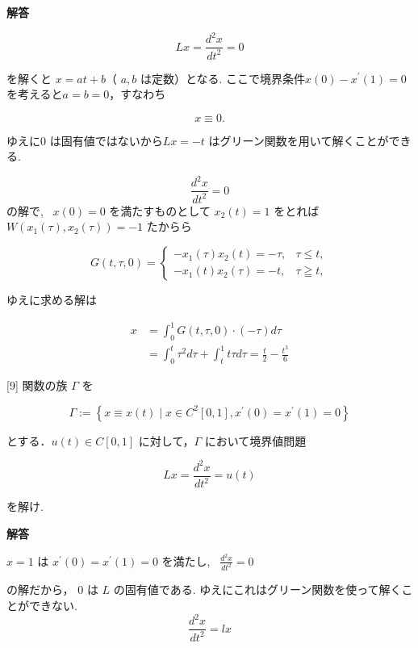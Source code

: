 \documentclass{jsarticle}
\begin{document}
\textbf{解答}


$$
L x=\frac{d^{2} x}{d t^{2}}=0
$$

を解くと $x=a t+b$（ $a, b$ は定数）となる. ここで境界条件$x(0)-x^{\prime}(1)=0$ を考えると$a = b = 0$，すなわち

$$
x \equiv 0 .
$$

ゆえに$0$ は固有値ではないから$Lx = -t$ はグリーン関数を用いて解くことができる.

$$
\frac{d^{2} x}{d t^{2}}=0
$$ の解で, \ $x(0) = 0$ を満たすものとして $x_{2}(t)=1$ をとれば $W\left(x_{1}(\tau), x_{2}(\tau)\right)=-1$ たからら

$$
G(t, \tau, 0)= \begin{cases}-x_{1}(\tau) x_{2}(t)=-\tau, & \tau \leq t, \\ -x_{1}(t) x_{2}(\tau)=-t, & \tau \geqq t,\end{cases}
$$

ゆえに求める解は

$$
\begin{aligned}
x & =\int_{0}^{1} G(t, \tau, 0) \cdot(-\tau) d \tau \\
& =\int_{0}^{t} \tau^{2} d \tau+\int_{t}^{1} t \tau d \tau=\frac{t}{2}-\frac{t^{3}}{6}
\end{aligned}
$$

\bigskip
\bigskip

\begin{itembox}[l]{[9]}
関数の族 $\Gamma$ を


\begin{equation*}
\Gamma:=\left\{x \equiv x(t) \mid x \in C^{2}[0,1], x^{\prime}(0)=x^{\prime}(1)=0\right\} \tag{19}
\end{equation*}


とする．$u(t) \in C[0,1]$ に対して，$\Gamma$ において境界値問題


\begin{equation*}
L x=\frac{d^{2} x}{d t^{2}}=u(t) \tag{20}
\end{equation*}


を解け.  
\end{itembox}

\textbf{解答}

$x=1$ は $x^{\prime}(0)=x^{\prime}(1)=0$ を満たし, \ 
$\frac{d^{2} x}{d t^{2}}=0$

の解だから， $0$ は $L$ の固有値である. ゆえにこれはグリーン関数を使って解くことができない.\\

$$
\frac{d^{2} x}{d t^{2}} = l x
$$
\end{document}
